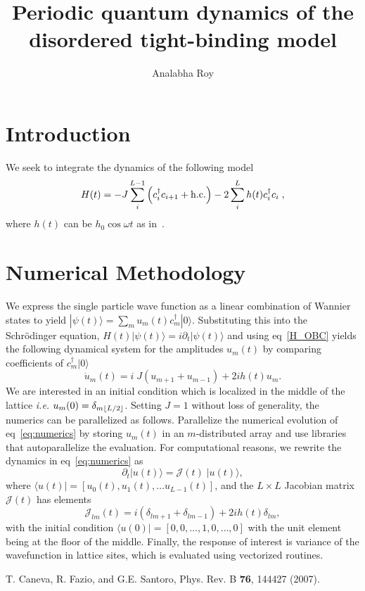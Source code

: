 \documentclass[a4paper,10pt]{article}
\title{Periodic quantum dynamics of the disordered tight-binding model}
\author{Analabha Roy}
\DeclarePairedDelimiter{\floor}{\lfloor}{\rfloor}
\begin{document}
\maketitle

\section{\sc Introduction}
\label{sec:intro}
We seek to integrate the dynamics of the following model
\begin{equation} \label{H_OBC}
H(t) = -  J \sum_i^{L-1} \left( c^{\dagger}_i c_{i+1}  + {\rm h.c.}\right) 
    - 2 \sum_i^{L} h(t) c^{\dagger}_i c_i \;,
\end{equation}
where $h(t)$ can be $h_0\cos{\omega t}$ as in~\cite{isingrand}.


\section{\sc Numerical Methodology}
\label{sec:numerics}
We express the single particle wave function as a linear combination of Wannier states to yield $|\psi(t)\rangle = \sum_m u_m(t) c^\dagger_m|0\rangle$. Substituting this into the Schr\"odinger equation, $H(t) |\psi(t)\rangle = i \partial_t|\psi(t)\rangle$ and using eq~\ref{H_OBC} yields the following dynamical system for the amplitudes $u_m(t)$ by comparing coefficients of $c^\dagger_m|0\rangle$
\begin{equation}
\label{eq:numerics}
\dot{u}_m(t) = i\; J \left(u_{m+1}+u_{m-1}\right)+2i h(t) u_m .
\end{equation}
We are interested in an initial condition which is localized in the middle of the lattice \textit{i.e.} $u_m(0)=\delta_{m\floor{L/2}}$. Setting $J=1$ without loss of generality, the numerics can be parallelized as follows. Parallelize the numerical evolution of eq~\ref{eq:numerics} by storing $u_m(t)$ in an $m$-distributed array and use libraries that autoparallelize the evaluation. For computational reasons, we rewrite the dynamics in eq~\ref{eq:numerics} as 
\begin{equation}
\partial_t |u(t)\rangle = \mathcal{J}(t)\;|u(t)\rangle,
\end{equation}
where $\langle u (t) | = [u_0(t), u_1(t), \dots u_{L-1}(t)]$, and the $L \times L$ Jacobian matrix $\mathcal{J}(t)$ has elements
\begin{equation}
\mathcal{J}_{lm}(t)= i\left(\delta_{lm+1}+\delta_{lm-1}\right)+2i h(t)\delta_{lm},
\end{equation}
with the initial condition $\langle u (0) | = [0, 0, \dots, 1, 0,\dots, 0]$ with the unit element being at the floor of the middle. Finally, the response of interest is variance of the wavefunction in lattice sites, which is evaluated using vectorized routines.


\begin{thebibliography}{10}
\newblock T. Caneva, R. Fazio, and G.E. Santoro, Phys. Rev. B {\bf 76}, 144427 (2007).
\end{thebibliography}
\end{document}
